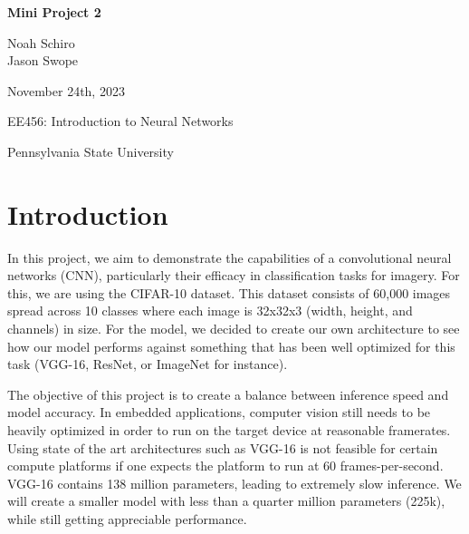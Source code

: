 \documentclass[letterpaper, 12pt]{article}
\begin{document}


\begin{titlepage}
    \begin{center}
        \vspace*{1in}
        \Huge{\textbf{Mini Project 2}}
        
        \vspace{0.5in}
        \Large{Noah Schiro}\\
        \Large{Jason Swope}
        
        \vfill
        
        \normalsize{November 24th, 2023}
        
        \vspace{0.5in}
        
        \normalsize{EE456: Introduction to Neural Networks}
        
        \vspace{0.5in}
        
        \normalsize{Pennsylvania State University}
        
    \end{center}
\end{titlepage}

\newpage

\setlength{\parindent}{5ex}

\section{Introduction}
In this project, we aim to demonstrate the capabilities of a convolutional neural networks (CNN), particularly their efficacy in classification tasks for imagery. For this, we are using the CIFAR-10 dataset. This dataset consists of 60,000 images spread across 10 classes where each image is 32x32x3 (width, height, and channels) in size. For the model, we decided to create our own architecture to see how our model performs against something that has been well optimized for this task (VGG-16, ResNet, or ImageNet for instance).

The objective of this project is to create a balance between inference speed and model accuracy. In embedded applications, computer vision still needs to be heavily optimized in order to run on the target device at reasonable framerates. Using state of the art architectures such as VGG-16 is not feasible for certain compute platforms if one expects the platform to run at 60 frames-per-second. VGG-16 contains 138 million parameters, leading to extremely slow inference. We will create a smaller model with less than a quarter million parameters (225k), while still getting appreciable performance.
\end{document}
